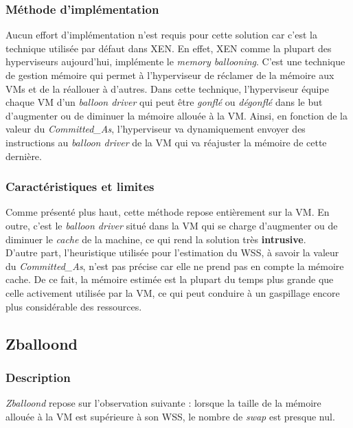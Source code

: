 \subsubsection{Méthode d'implémentation}
Aucun effort d'implémentation n'est requis pour cette solution car c'est la technique utilisée par défaut dans XEN. En effet, XEN comme la plupart des hyperviseurs aujourd'hui, implémente le \textit{memory ballooning}\cite{article9, article10}. C'est une technique de gestion mémoire qui permet à l'hyperviseur de réclamer de la mémoire aux VMs et de la réallouer à d'autres. Dans cette technique, l'hyperviseur équipe chaque VM d'un \textit{balloon driver} qui peut être \textit{gonflé} ou \textit{dégonflé} dans le but d'augmenter ou de diminuer la mémoire allouée à la VM. Ainsi, en fonction de la valeur du \textit{Committed\_As}, l'hyperviseur va dynamiquement envoyer des instructions au \textit{balloon driver} de la VM qui va réajuster la mémoire de cette dernière.

\subsubsection{Caractéristiques et limites}
Comme présenté plus haut, cette méthode repose entièrement sur la VM. En outre, c'est le \textit{balloon driver} situé dans la VM qui se charge d'augmenter ou de diminuer le \textit{cache} de la machine, ce qui rend la solution très \textbf{intrusive}.\\
D'autre part, l'heuristique utilisée pour l'estimation du WSS, à savoir la valeur du \textit{Committed\_As}, n'est pas précise car elle ne prend pas en compte la mémoire cache. De ce fait, la mémoire estimée est la plupart du temps plus grande que celle activement utilisée par la VM, ce qui peut conduire à un gaspillage encore plus considérable des ressources.

\subsection{Zballoond}

\subsubsection{Description}
\emph{Zballoond} \cite{zballoond} repose sur l'observation suivante : lorsque la taille de la mémoire allouée à la VM est supérieure à son WSS, le nombre de \textit{swap} est presque nul.\\

